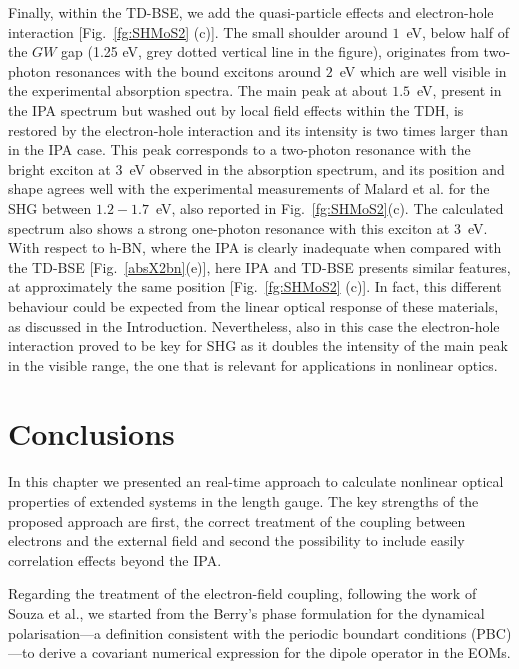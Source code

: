 Finally, within the TD-BSE, we add the quasi-particle effects and electron-hole interaction  [Fig.~\ref{fg:SHMoS2} (c)]. The small shoulder around $1$~eV, below half of the $GW$ gap (1.25 eV, grey dotted vertical line in the figure), originates from two-photon resonances with the bound excitons around $2$~eV which are well visible in the experimental absorption spectra.\cite{PhysRevLett.105.136805}  The main peak at about $1.5$~eV, present in the IPA spectrum but washed out by local field effects within the TDH, is restored by the electron-hole interaction and its intensity is two times larger than in the IPA case. This peak corresponds to a two-photon resonance with the bright exciton at 3~eV observed in the absorption spectrum,\cite{molina2013effect} and its position and shape agrees well with the experimental measurements of Malard et al.\cite{PhysRevB.87.201401} for the SHG between $1.2-1.7$~eV, also reported in Fig.~\ref{fg:SHMoS2}(c). The calculated spectrum also shows a strong one-photon resonance with this exciton at 3~eV.
With respect to h-BN, where the IPA is clearly inadequate when compared with the TD-BSE [Fig.~\ref{absX2bn}(e)], here IPA and TD-BSE  presents similar features, at approximately the same position [Fig.~\ref{fg:SHMoS2} (c)]. In fact, this different behaviour could be expected from the linear optical response of these materials, as discussed in the Introduction. Nevertheless, also in this case the electron-hole interaction proved to be key for SHG as it doubles the intensity of the main peak in the visible range, the one that is relevant for applications in nonlinear optics.     	

\section{Conclusions}\label{conclusion}                                        
In this chapter we presented an \ai real-time approach to calculate nonlinear optical properties of extended systems in the length gauge. The key strengths of the proposed approach are first, the correct treatment of the coupling between electrons and the external field and second the possibility to include easily correlation effects beyond the IPA.

Regarding the treatment of the electron-field coupling, following the work of Souza et al.\cite{souza_prb}, we started from the Berry's phase formulation for the dynamical polarisation---a definition consistent with the periodic boundart conditions (PBC)---to derive a covariant numerical expression for the dipole operator in the EOMs.

